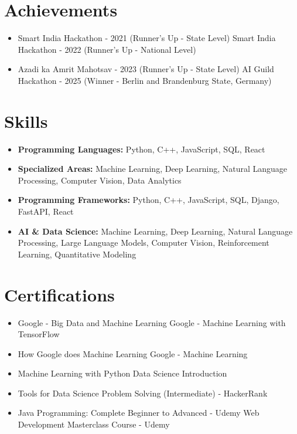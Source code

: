 \documentclass[a4paper,10pt]{article}
\begin{document}
\section*{Achievements}
\begin{itemize}
\item Smart India Hackathon - 2021 (Runner's Up - State Level) \hfill Smart India Hackathon - 2022 (Runner's Up - National Level)
\item Azadi ka Amrit Mahotsav - 2023 (Runner's Up - State Level) \hfill AI Guild Hackathon - 2025 (Winner - Berlin and Brandenburg State, Germany)
\end{itemize}

\section*{Skills}
\begin{itemize}
  \item \textbf{Programming Languages:} Python, C++, JavaScript, SQL, React
  \item \textbf{Specialized Areas:} Machine Learning, Deep Learning, Natural Language Processing, Computer Vision, Data Analytics
  \item \textbf{Programming Frameworks:} Python, C++, JavaScript, SQL, Django, FastAPI, React
  \item \textbf{AI \& Data Science:} Machine Learning, Deep Learning, Natural Language Processing, Large Language Models, Computer Vision, Reinforcement Learning, Quantitative Modeling
\end{itemize}

\section*{Certifications}
\begin{itemize}
\item Google - Big Data and Machine Learning \hfill Google - Machine Learning with TensorFlow
\item How Google does Machine Learning \hfill Google - Machine Learning
\item Machine Learning with Python \hfill Data Science Introduction
\item Tools for Data Science \hfill Problem Solving (Intermediate) - HackerRank
\item Java Programming: Complete Beginner to Advanced - Udemy \hfill Web Development Masterclass Course - Udemy
\end{itemize}
\end{document}
